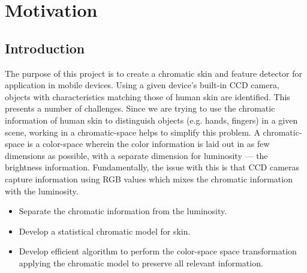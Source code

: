 
\chapter{Motivation}  %

\ifpdf
    \graphicspath{{Chapter1/Figs/Raster/}{Chapter1/Figs/PDF/}{Chapter1/Figs/}}
\else
    \graphicspath{{Chapter1/Figs/Vector/}{Chapter1/Figs/}}
\fi

\section{Introduction}\label{sec:Introduction}

The purpose of this project is to create a chromatic skin and feature detector for application in mobile devices. Using a given device's built-in CCD camera, objects with characteristics matching those of human skin are identified. This presents a number of challenges. Since we are trying to use the chromatic information of human skin to distinguish objects (e.g. hands, fingers) in a given scene, working in a chromatic-space helps to simplify this problem. A chromatic-space is a color-space wherein the color information is laid out in as few dimensions as possible, with a separate dimension for luminosity --- the brightness information. Fundamentally, the issue with this is that CCD cameras capture information using RGB values which mixes the chromatic information with the luminosity. 

\begin{itemize}
\item Separate the chromatic information from the luminosity.
\item Develop a statistical chromatic model for skin.
\item Develop efficient algorithm to perform the color-space space transformation applying the chromatic model to preserve all relevant information.
\end{itemize}
%
%
%

